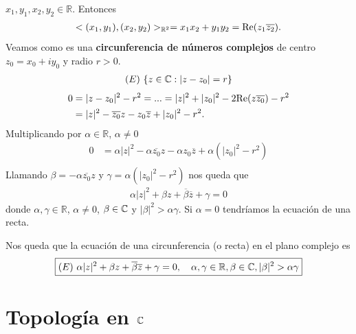 $x_1,y_1,x_2,y_2 \in \mathbb{R}$. Entonces
\begin{align*}
    <(x_1,y_1), (x_2,y_2)>_{\mathbb{R}^2} = x_1x_2 + y_1y_2 = \text{Re}(z_1\overline{z_2}).
\end{align*}
Veamos como es una \textbf{circunferencia de números complejos} de centro $z_0 = x_0 +iy_0$ y radio $r > 0$.
\begin{align*}
    (E) \ \{ z \in \mathbb{C} : |z - z_0| = r \}
\end{align*}
\begin{align*}
    0 & = |z-z_0|^2 - r^2 = ... = |z|^2 + |z_0|^2 - 2\text{Re}(z\overline{z_0}) - r^2 \\
      & = |z|^2 - \overline{z_0}z - z_0\overline{z} + |z_0|^2 - r^2.
\end{align*}
Multiplicando por $\alpha \in \mathbb{R}$, $\alpha \not = 0$
\begin{align*}
    0 & = \alpha |z|^2 - \alpha \overline{z_0}z - \alpha z_0\overline{z} + \alpha (|z_0|^2 - r^2) \\
\end{align*}
Llamando $\beta = -\alpha\overline{z_0}z$ y $\gamma =  \alpha (|z_0|^2 - r^2)$ nos queda que
\begin{align*}
    \alpha|z|^2 + \beta z + \overline{\beta} \overline{z} + \gamma = 0
\end{align*}
donde $\alpha, \gamma \in \mathbb{R}$, $\alpha \not = 0$, $\beta \in \mathbb{C}$ y $|\beta|^2 > \alpha \gamma$. Si $\alpha = 0$ tendríamos la ecuación de una recta.

Nos queda que la ecuación de una circunferencia (o recta) en el plano complejo es
\begin{align*}
    \boxed{
        (E) \ \alpha|z|^2 + \beta z + \overline{\beta} \overline{z} + \gamma = 0, \ \ \ \alpha, \gamma \in \mathbb{R}, \beta \in \mathbb{C}, |\beta|^2 > \alpha \gamma
    }
\end{align*}

\section{Topología en $\mathbb{C}$}

